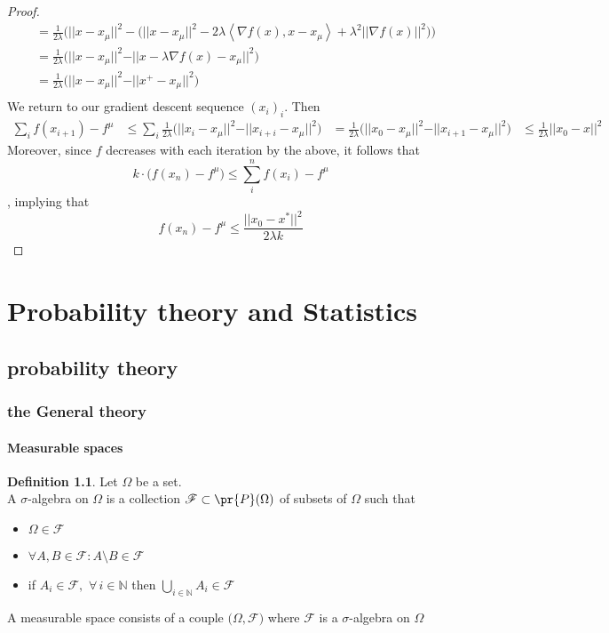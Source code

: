 \documentclass{book}
\theoremstyle{plain}
\theoremstyle{definition}
\newtheorem{definition}[corollary]{Definition}
\newcommand{\bl}[2]{\left\langle #1,#2\right\rangle}
\renewcommand{\d}[1]{\mathbb{#1}}
\newcommand{\norm}[1]{\vert \vert #1 \vert \vert}
\renewcommand{\r}[1]{\mathcal{#1}}
\begin{document}
\begin{proof}
\begin{align*}
 & = \frac{1}{2\lambda}\bigg(\vert \vert x - x_\mu\vert \vert^2 -\big(\vert \vert x-x_\mu \vert \vert^2 -2\lambda \bl{\nabla f(x)}{x -x_\mu}+\lambda^2\vert \vert \nabla f(x)\vert \vert^2 \big)\bigg)\\
 &=\frac{1}{2\lambda}\bigg(\vert \vert x-x_\mu\vert \vert^2-\vert \vert x-\lambda \nabla f(x)-x_\mu \vert \vert^2 \bigg)\\
 &=\frac{1}{2\lambda}\bigg(\vert \vert x-x_\mu\vert \vert^2-\vert \vert x^+-x_\mu \vert \vert^2 \bigg)\\
 \end{align*}
We return to our gradient descent sequence $(x_i)_i$. Then
\begin{align*}
\sum_i f(x_{i+1})-f^\mu	& \le \sum_i \frac{1}{2\lambda}\bigg(\vert \vert x_i-x_\mu\vert \vert^2-\vert \vert x_{i+i}-x_\mu \vert \vert^2 \bigg)
&= \frac{1}{2\lambda}\bigg(\vert \vert x_0-x_\mu\vert \vert^2-\vert \vert x_{i+1}-x_\mu \vert \vert^2 \bigg)
&\le \frac{1}{2\lambda}\vert \vert x_0-x\vert\vert^2
\end{align*}
Moreover, since $f$ decreases with each iteration by the above, it follows that 
\[k\cdot \big(f(x_n)-f^\mu\big)\le \sum^n_i f(x_i)-f^\mu
\], implying that
\[
f(x_{n})-f^\mu\le \frac{\norm{x_0-x^*}^2}{2\lambda k}
\]
\end{proof}


\part{Probability theory and Statistics}
\chapter{probability theory}
\section{the General theory}

\subsection{Measurable spaces}
\begin{definition}
Let $\Omega$ be a set.\\
A $\sigma$-algebra on $\Omega$ is a collection $\r{F}\subset \pr{P}(\Omega)$ of subsets of $\Omega$ such that
\begin{itemize}
\item $\Omega \in \r{F}$
\item $\forall A, B \in\r{F}: A\setminus B \in\r{F}$
\item if $A_i\in\r{F},\,\,\forall \,i \in \d{N}$ then $\bigcup_{i \in \d{N}} A_i \in \r{F}$
\end{itemize}
A measurable space consists of a couple $\big(\Omega,\r{F}\big)$ where $\r{F}$ is a $\sigma$-algebra on $\Omega$
\end{definition}
\end{document}
